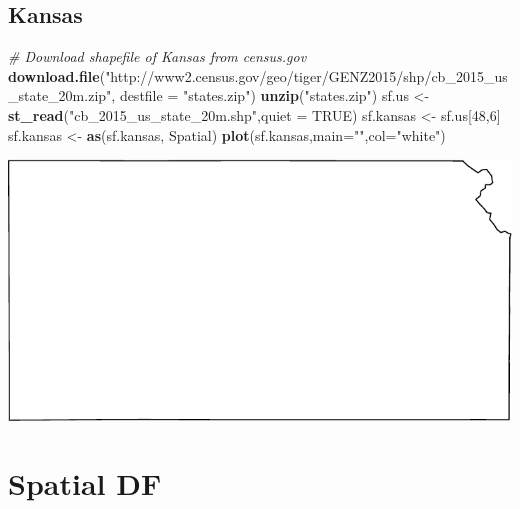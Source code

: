\documentclass[
]{book}
\newenvironment{Shaded}{\begin{snugshade}}{\end{snugshade}}
\newcommand{\AttributeTok}[1]{\textcolor[rgb]{0.13,0.29,0.53}{#1}}
\newcommand{\CommentTok}[1]{\textcolor[rgb]{0.56,0.35,0.01}{\textit{#1}}}
\newcommand{\ConstantTok}[1]{\textcolor[rgb]{0.56,0.35,0.01}{#1}}
\newcommand{\DecValTok}[1]{\textcolor[rgb]{0.00,0.00,0.81}{#1}}
\newcommand{\FunctionTok}[1]{\textcolor[rgb]{0.13,0.29,0.53}{\textbf{#1}}}
\newcommand{\NormalTok}[1]{#1}
\newcommand{\OtherTok}[1]{\textcolor[rgb]{0.56,0.35,0.01}{#1}}
\newcommand{\StringTok}[1]{\textcolor[rgb]{0.31,0.60,0.02}{#1}}
\begin{document}
\hypertarget{kansas}{%
\section{Kansas}\label{kansas}}

\begin{Shaded}
\begin{Highlighting}[]
\CommentTok{\# Download shapefile of Kansas from census.gov}
\FunctionTok{download.file}\NormalTok{(}\StringTok{"http://www2.census.gov/geo/tiger/GENZ2015/shp/cb\_2015\_us\_state\_20m.zip"}\NormalTok{, }\AttributeTok{destfile =} \StringTok{"states.zip"}\NormalTok{)}
\FunctionTok{unzip}\NormalTok{(}\StringTok{"states.zip"}\NormalTok{)}
\NormalTok{sf.us }\OtherTok{\textless{}{-}} \FunctionTok{st\_read}\NormalTok{(}\StringTok{"cb\_2015\_us\_state\_20m.shp"}\NormalTok{,}\AttributeTok{quiet =} \ConstantTok{TRUE}\NormalTok{)}
\NormalTok{sf.kansas }\OtherTok{\textless{}{-}}\NormalTok{ sf.us[}\DecValTok{48}\NormalTok{,}\DecValTok{6}\NormalTok{]}
\NormalTok{sf.kansas }\OtherTok{\textless{}{-}} \FunctionTok{as}\NormalTok{(sf.kansas, }\StringTok{\textquotesingle{}Spatial\textquotesingle{}}\NormalTok{)}
\FunctionTok{plot}\NormalTok{(sf.kansas,}\AttributeTok{main=}\StringTok{""}\NormalTok{,}\AttributeTok{col=}\StringTok{"white"}\NormalTok{)}
\end{Highlighting}
\end{Shaded}

\includegraphics{_main_files/figure-latex/unnamed-chunk-25-1.pdf}

\hypertarget{spatial-df}{%
\chapter{Spatial DF}\label{spatial-df}}
\end{document}
